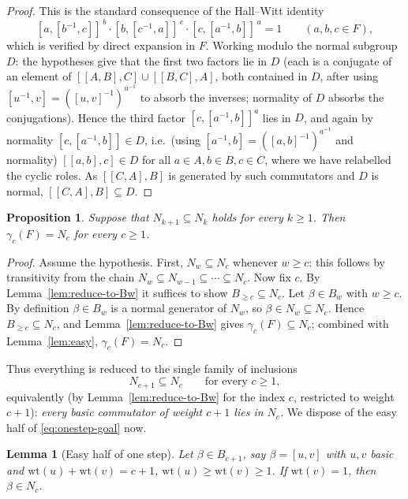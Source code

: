 \documentclass{amsart}
\newtheorem{lemma}{Lemma}
\newtheorem{proposition}{Proposition}
\theoremstyle{definition}
\theoremstyle{remark}
\begin{document}
\begin{proof}
This is the standard consequence of the Hall--Witt identity
\[
[a,[b^{-1},c]]^{\,b}\cdot[b,[c^{-1},a]]^{\,c}\cdot[c,[a^{-1},b]]^{\,a}=1
\qquad(a,b,c\in F),
\]
which is verified by direct expansion in $F$. Working modulo the normal subgroup
$D$: the hypotheses give that the first two factors lie in $D$ (each is a conjugate
of an element of $[[A,B],C]\cup[[B,C],A]$, both contained in $D$, after using
$[u^{-1},v]=([u,v]^{-1})^{u^{-1}}$ to absorb the inverses; normality of $D$ absorbs
the conjugations). Hence the third factor $[c,[a^{-1},b]]^{a}$ lies in $D$, and
again by normality $[c,[a^{-1},b]]\in D$, i.e.\ (using
$[a^{-1},b]=([a,b]^{-1})^{a^{-1}}$ and normality) $[[a,b],c]\in D$ for all
$a\in A,b\in B,c\in C$, where we have relabelled the cyclic roles. As $[[C,A],B]$
is generated by such commutators and $D$ is normal, $[[C,A],B]\subseteq D$.
\end{proof}

\begin{proposition}\label{prop:reduce}
Suppose that $N_{k+1}\subseteq N_k$ holds for every $k\ge1$. Then $\gamma_c(F)=N_c$
for every $c\ge1$.
\end{proposition}

\begin{proof}
Assume the hypothesis. First, $N_{w}\subseteq N_c$ whenever $w\ge c$: this follows
by transitivity from the chain $N_{w}\subseteq N_{w-1}\subseteq\cdots\subseteq
N_c$. Now fix $c$. By Lemma~\ref{lem:reduce-to-Bw} it suffices to show
$B_{\ge c}\subseteq N_c$. Let $\beta\in B_w$ with $w\ge c$. By definition
$\beta\in B_w$ is a normal generator of $N_w$, so $\beta\in N_w\subseteq N_c$.
Hence $B_{\ge c}\subseteq N_c$, and Lemma~\ref{lem:reduce-to-Bw} gives
$\gamma_c(F)\subseteq N_c$; combined with Lemma~\ref{lem:easy},
$\gamma_c(F)=N_c$.
\end{proof}

\noindent
Thus everything is reduced to the single family of inclusions
\begin{equation}\label{eq:onestep-goal}
N_{c+1}\subseteq N_c\qquad\text{for every }c\ge1,
\end{equation}
equivalently (by Lemma~\ref{lem:reduce-to-Bw} for the index $c$, restricted to
weight $c+1$): \emph{every basic commutator of weight $c+1$ lies in $N_c$.} We
dispose of the easy half of \eqref{eq:onestep-goal} now.

\begin{lemma}[Easy half of one step]\label{lem:easy-half}
Let $\beta\in B_{c+1}$, say $\beta=[u,v]$ with $u,v$ basic and
$\mathrm{wt}(u)+\mathrm{wt}(v)=c+1$, $\mathrm{wt}(u)\ge\mathrm{wt}(v)\ge1$. If
$\mathrm{wt}(v)=1$, then $\beta\in N_c$.
\end{lemma}
\end{document}
